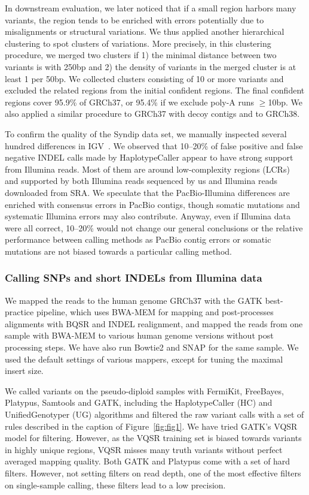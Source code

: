 \documentclass{bioinfo}
\begin{document}
\begin{methods}
In downstream evaluation, we later noticed that if a small region harbors many
variants, the region tends to be enriched with errors potentially due to
misalignments or structural variations.  We thus applied another hierarchical
clustering to spot clusters of variations.  More precisely, in this clustering
procedure, we merged two clusters if 1) the minimal distance between two
variants is with 250bp and 2) the density of variants in the merged cluster is
at least 1 per 50bp. We collected clusters consisting of 10 or more variants
and excluded the related regions from the initial confident regions. The final
confident regions cover 95.9\% of GRCh37, or 95.4\% if we exclude poly-A runs
$\ge$10bp. We also applied a similar procedure to GRCh37 with decoy contigs and
to GRCh38.

To confirm the quality of the Syndip data set, we manually inspected several
hundred differences in IGV~\citep{Robinson:2011uo}. We observed that 10--20\%
of false positive and false negative INDEL calls made by HaplotypeCaller appear
to have strong support from Illumina reads. Most of them are around
low-complexity regions (LCRs) and supported by both Illumina reads sequenced by
us and Illumina reads downloaded from SRA. We speculate that the
PacBio-Illumina differences are enriched with consensus errors in PacBio
contigs, though somatic mutations and systematic Illumina errors may also
contribute. Anyway, even if Illumina data were all correct, 10--20\% would not
change our general conclusions or the relative performance between calling
methods as PacBio contig errors or somatic mutations are not biased towards a
particular calling method.

\subsubsection*{Calling SNPs and short INDELs from Illumina data}

We mapped the reads to the human genome GRCh37 with the GATK best-practice
pipeline, which uses BWA-MEM for mapping and post-processes alignments with BQSR and INDEL realignment, and mapped the reads from one sample with BWA-MEM to various human genome
versions without post processing steps. We have also run Bowtie2 and SNAP for the same sample. We used the
default settings of various mappers, except for tuning the maximal insert size.

We called variants on the pseudo-diploid samples with FermiKit, FreeBayes,
Platypus, Samtools and GATK, including the HaplotypeCaller (HC) and
UnifiedGenotyper (UG) algorithms and filtered the raw variant calls with a set
of rules described in the caption of Figure~\ref{fig:fig1}.  We have tried
GATK's VQSR model for filtering. However, as the VQSR training set is biased
towards variants in highly unique regions, VQSR misses many truth variants
without perfect averaged mapping quality. Both GATK and Platypus come with a
set of hard filters. However, not setting filters on read depth, one of the
most effective filters on single-sample calling, these filters lead to a low
precision.


\end{methods}
\end{document}
